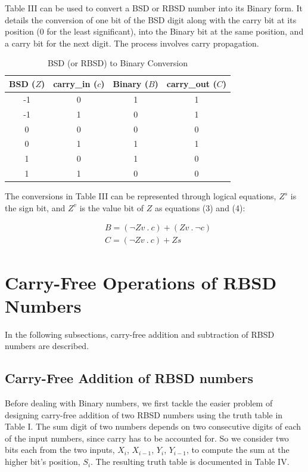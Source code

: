 \documentclass[conference]{IEEEtran}
\begin{document}
Table III can be used to convert a BSD or RBSD number into its Binary form. It details the conversion of one bit of the BSD digit along with the carry bit at its position (0 for the least significant), into the Binary bit at the same position, and a carry bit for the next digit. The process involves carry propagation.

\vspace{-.5em}
\begin{table}[h!]
  \centering
  \caption{BSD (or RBSD) to Binary Conversion}
  \label{tab:table3}
  \begin{tabular}{|c|c||c|c|}
    \hline
    BSD ($Z$) & carry\_in ($c$) & Binary ($B$) & carry\_out ($C$) \\
    \hline
    \hline
    -1 & 0 & 1 & 1\\
    \hline
    -1 & 1 & 0 & 1\\
    \hline
    0 & 0 & 0 & 0\\
    \hline
    0 & 1 & 1 & 1\\
    \hline
    1 & 0 & 1 & 0\\
    \hline
    1 & 1 & 0 & 0\\
    \hline
  \end{tabular}
\end{table}

The conversions in Table III can be represented through logical equations, $Z^{s}$ is the sign bit, and $Z^{v}$ is the value bit of $Z$ as equations (3) and (4):

\vspace{-1em}
\begin{align}
&B = (\neg Zv \ . \ c) + (Zv \ . \ \neg c) \\
&C = (\neg Zv \ . \ c) + Zs
\end{align}

\section{Carry-Free Operations of RBSD Numbers}

In the following subsections, carry-free addition and subtraction of RBSD numbers are described.

\subsection{Carry-Free Addition of RBSD numbers}

Before dealing with Binary numbers, we first tackle the easier problem of designing carry-free addition of two RBSD numbers using the truth table in Table I. The sum digit of two numbers depends on two consecutive digits of each of the input numbers, since carry has to be accounted for. So we consider two bits each from the two inputs, $X_{i}$, $X_{i-1}$, $Y_{i}$, $Y_{i-1}$, to compute the sum at the higher bit’s position, $S_{i}$. The resulting truth table is documented in Table IV.
\end{document}
